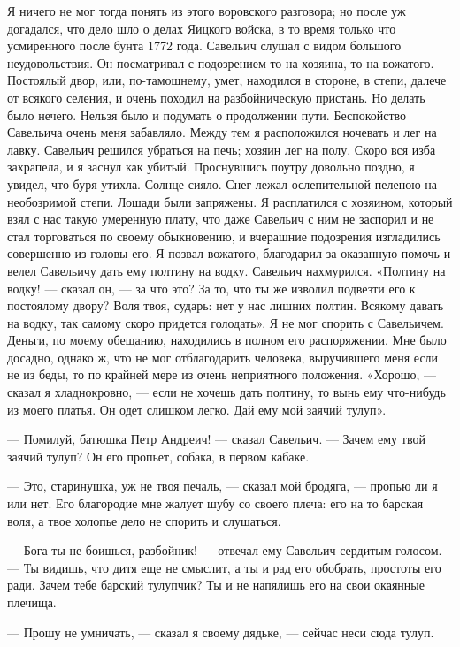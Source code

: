 Я ничего не мог тогда понять из этого воровского разговора; но после уж догадался, что дело шло о делах Яицкого войска, в то время только что усмиренного после бунта 1772 года. Савельич слушал с видом большого неудовольствия. Он посматривал с подозрением то на хозяина, то на вожатого. Постоялый двор, или, по-тамошнему, умет, находился в стороне, в степи, далече от всякого селения, и очень походил на разбойническую пристань. Но делать было нечего. Нельзя было и подумать о продолжении пути. Беспокойство Савельича очень меня забавляло. Между тем я расположился ночевать и лег на лавку. Савельич решился убраться на печь; хозяин лег на полу. Скоро вся изба захрапела, и я заснул как убитый.
Проснувшись поутру довольно поздно, я увидел, что буря утихла. Солнце сияло. Снег лежал ослепительной пеленою на необозримой степи. Лошади были запряжены. Я расплатился с хозяином, который взял с нас такую умеренную плату, что даже Савельич с ним не заспорил и не стал торговаться по своему обыкновению, и вчерашние подозрения изгладились совершенно из головы его. Я позвал вожатого, благодарил за оказанную помочь и велел Савельичу дать ему полтину на водку. Савельич нахмурился. «Полтину на водку! — сказал он, — за что это? За то, что ты же изволил подвезти его к постоялому двору? Воля твоя, сударь: нет у нас лишних полтин. Всякому давать на водку, так самому скоро придется голодать». Я не мог спорить с Савельичем. Деньги, по моему обещанию, находились в полном его распоряжении. Мне было досадно, однако ж, что не мог отблагодарить человека, выручившего меня если не из беды, то по крайней мере из очень неприятного положения. «Хорошо, — сказал я хладнокровно, — если не хочешь дать полтину, то вынь ему что-нибудь из моего платья. Он одет слишком легко. Дай ему мой заячий тулуп».

— Помилуй, батюшка Петр Андреич! — сказал Савельич. — Зачем ему твой заячий тулуп? Он его пропьет, собака, в первом кабаке.

— Это, старинушка, уж не твоя печаль, — сказал мой бродяга, — пропью ли я или нет. Его благородие мне жалует шубу со своего плеча: его на то барская воля, а твое холопье дело не спорить и слушаться.

— Бога ты не боишься, разбойник! — отвечал ему Савельич сердитым голосом. — Ты видишь, что дитя еще не смыслит, а ты и рад его обобрать, простоты его ради. Зачем тебе барский тулупчик? Ты и не напялишь его на свои окаянные плечища.

— Прошу не умничать, — сказал я своему дядьке, — сейчас неси сюда тулуп.

